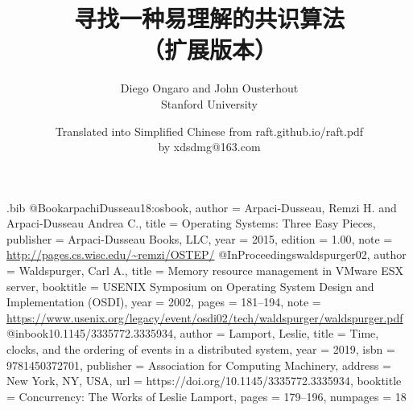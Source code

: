\usepackage{filecontents}

\usepackage{CJKutf8}

\begin{filecontents}{\jobname.bib}
@Book{arpachiDusseau18:osbook,
  author =       {Arpaci-Dusseau, Remzi H. and Arpaci-Dusseau Andrea C.},
  title =        {Operating Systems: Three Easy Pieces},
  publisher =    {Arpaci-Dusseau Books, LLC},
  year =         2015,
  edition =      {1.00},
  note =         {\url{http://pages.cs.wisc.edu/~remzi/OSTEP/}}
}
@InProceedings{waldspurger02,
  author =       {Waldspurger, Carl A.},
  title =        {Memory resource management in {VMware ESX} server},
  booktitle =    {USENIX Symposium on Operating System Design and
                  Implementation (OSDI)},
  year =         2002,
  pages =        {181--194},
  note =         {\url{https://www.usenix.org/legacy/event/osdi02/tech/waldspurger/waldspurger.pdf}}}
@inbook{10.1145/3335772.3335934,
  author = {Lamport, Leslie},
  title = {Time, clocks, and the ordering of events in a distributed system},
  year = {2019},
  isbn = {9781450372701},
  publisher = {Association for Computing Machinery},
  address = {New York, NY, USA},
  url = {https://doi.org/10.1145/3335772.3335934},
  booktitle = {Concurrency: The Works of Leslie Lamport},
  pages = {179–196},
  numpages = {18}}
\end{filecontents}



\date{}

\title{\Large \bf 寻找一种易理解的共识算法\\
  （扩展版本）}

\author{
  {\rm Diego Ongaro and John Ousterhout}\\
  Stanford University
  \and
  {\rm Translated into Simplified Chinese from raft.github.io/raft.pdf}\\
  {\rm by xdsdmg@163.com}
} %

\maketitle

